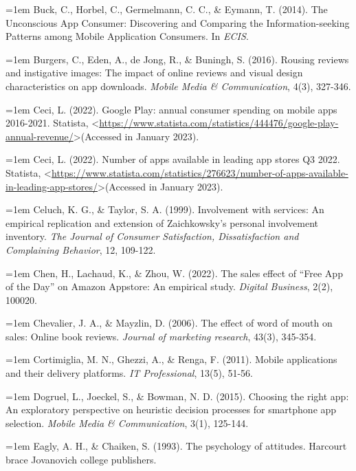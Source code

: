 \hangindent=1em
Buck, C., Horbel, C., Germelmann, C. C., \& Eymann, T. (2014). The Unconscious App Consumer: Discovering and Comparing the Information-seeking Patterns among Mobile Application Consumers. In \textit{ECIS}.

\hangindent=1em
Burgers, C., Eden, A., de Jong, R., \& Buningh, S. (2016). Rousing reviews and instigative images: The impact of online reviews and visual design characteristics on app downloads. \textit{Mobile Media \& Communication}, 4(3), 327-346.

\hangindent=1em
Ceci, L. (2022). Google Play: annual consumer spending on mobile apps 2016-2021. Statista, \textless \url{https://www.statista.com/statistics/444476/google-play-annual-revenue/}\textgreater (Accessed in January 2023).

\hangindent=1em
Ceci, L. (2022). Number of apps available in leading app stores Q3 2022. Statista, \textless \url{https://www.statista.com/statistics/276623/number-of-apps-available-in-leading-app-stores/}\textgreater (Accessed in January 2023).

\hangindent=1em
Celuch, K. G., \& Taylor, S. A. (1999). Involvement with services: An empirical replication and extension of Zaichkowsky's personal involvement inventory. \textit{The Journal of Consumer Satisfaction, Dissatisfaction and Complaining Behavior}, 12, 109-122.

\hangindent=1em
Chen, H., Lachaud, K., \& Zhou, W. (2022). The sales effect of “Free App of the Day” on Amazon Appstore: An empirical study. \textit{Digital Business}, 2(2), 100020.

\hangindent=1em
Chevalier, J. A., \& Mayzlin, D. (2006). The effect of word of mouth on sales: Online book reviews. \textit{Journal of marketing research}, 43(3), 345-354.

\hangindent=1em
Cortimiglia, M. N., Ghezzi, A., \& Renga, F. (2011). Mobile applications and their delivery platforms. \textit{IT Professional}, 13(5), 51-56.

\hangindent=1em
Dogruel, L., Joeckel, S., \& Bowman, N. D. (2015). Choosing the right app: An exploratory perspective on heuristic decision processes for smartphone app selection. \textit{Mobile Media \& Communication}, 3(1), 125-144.

\hangindent=1em
Eagly, A. H., \& Chaiken, S. (1993). The psychology of attitudes. Harcourt brace Jovanovich college publishers.

